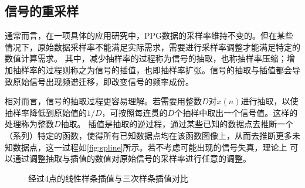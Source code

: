 \subsection{信号的重采样}
通常而言，在一项具体的应用研究中，PPG数据的采样率维持不变的。但在某些情况下，原始数据采样率不能满足实际需求，需要进行采样率调整才能满足特定的数值计算需求。
其中，减少抽样率的过程称为信号的抽取，也称抽样率压缩；增加抽样率的过程则称之为信号的插值，也即抽样率扩张\cite{Cheng2008}。信号的抽取与插值都会导致原始信号出现频谱迁移，即改变信号的频率成份\cite{Cheng2008}。

相对而言，信号的抽取过程更容易理解。若需要用整数$D$对$x(n)$进行抽取，以使抽样率降低到原始值的$1/D$，可按照每连贯的$D$个抽样中取出一个信号值。这样的处理称为整数$D$抽取\cite{Cheng2008}。
插值是抽取的逆过程，通过某些已知的数据点去推断一个（系列）特定的函数，使得所有已知数据点均在该函数图像上，从而去推断更多未知数据点，这一过程如\autoref{fig:spline}所示。若不考虑可能出现的信号失真，理论上
可以通过调整抽取与插值的数值对原始信号的采样率进行任意的调整。
\begin{figure}[htbp]
    \centering
    \quad
    \caption{\label{fig:spline}经过4点的线性样条插值与三次样条插值对比}
\end{figure}

